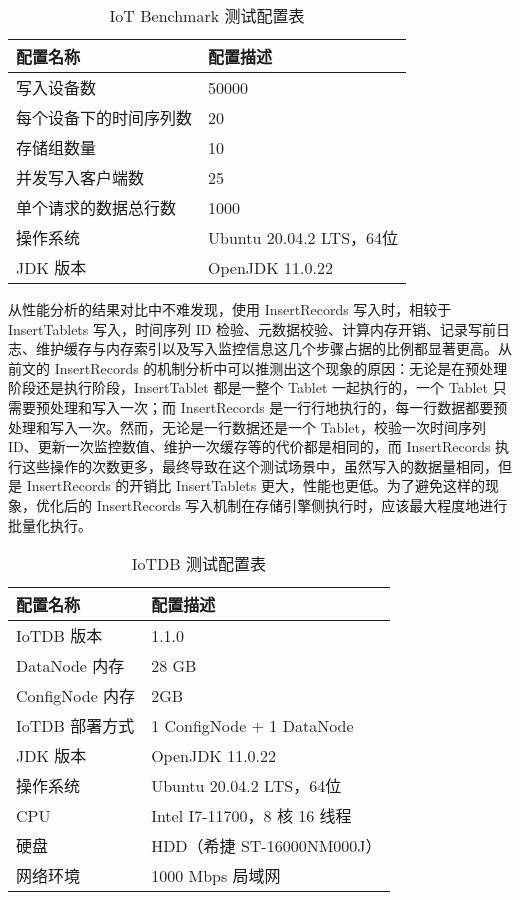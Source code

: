 \begin{table}
  \caption{IoT Benchmark 测试配置表}
  \centering
  \begin{tabular}{ll}
  \toprule
  配置名称 & 配置描述 \\
  \midrule
      写入设备数 &  50000 \\ 
      每个设备下的时间序列数 & 20 \\ 
      存储组数量 & 10 \\ 
      并发写入客户端数 & 25 \\ 
      单个请求的数据总行数 &  1000 \\ 
      操作系统 & Ubuntu 20.04.2 LTS，64位 \\
      JDK 版本 & OpenJDK 11.0.22 \\
  \bottomrule
  \end{tabular}
  \label{tabular:insert-records-profile-benchmark-config}
\end{table}

从性能分析的结果对比中不难发现，使用 InsertRecords 写入时，相较于 InsertTablets 写入，时间序列 ID 检验、元数据校验、计算内存开销、记录写前日志、维护缓存与内存索引以及写入监控信息这几个步骤占据的比例都显著更高。从前文的 InsertRecords 的机制分析中可以推测出这个现象的原因：无论是在预处理阶段还是执行阶段，InsertTablet 都是一整个 Tablet 一起执行的，一个 Tablet 只需要预处理和写入一次；而 InsertRecords 是一行行地执行的，每一行数据都要预处理和写入一次。然而，无论是一行数据还是一个 Tablet，校验一次时间序列 ID、更新一次监控数值、维护一次缓存等的代价都是相同的，而 InsertRecords 执行这些操作的次数更多，最终导致在这个测试场景中，虽然写入的数据量相同，但是 InsertRecords 的开销比 InsertTablets 更大，性能也更低。为了避免这样的现象，优化后的 InsertRecords 写入机制在存储引擎侧执行时，应该最大程度地进行批量化执行。

\begin{table}
  \caption{IoTDB 测试配置表}
  \centering
  \begin{tabular}{ll}
  \toprule
  配置名称 & 配置描述 \\
  \midrule
      IoTDB 版本 &  1.1.0 \\ 
      DataNode 内存 & 28 GB \\ 
      ConfigNode 内存 & 2GB \\ 
      IoTDB 部署方式 & 1 ConfigNode + 1 DataNode \\
      JDK 版本 & OpenJDK 11.0.22 \\
      操作系统 & Ubuntu 20.04.2 LTS，64位 \\
      CPU &  Intel I7-11700，8 核 16 线程 \\ 
      硬盘 & HDD（希捷 ST-16000NM000J） \\ 
      网络环境 & 1000 Mbps 局域网 \\
  \bottomrule
  \end{tabular}
  \label{tabular:insert-records-profile-iotdb-config}
\end{table}

